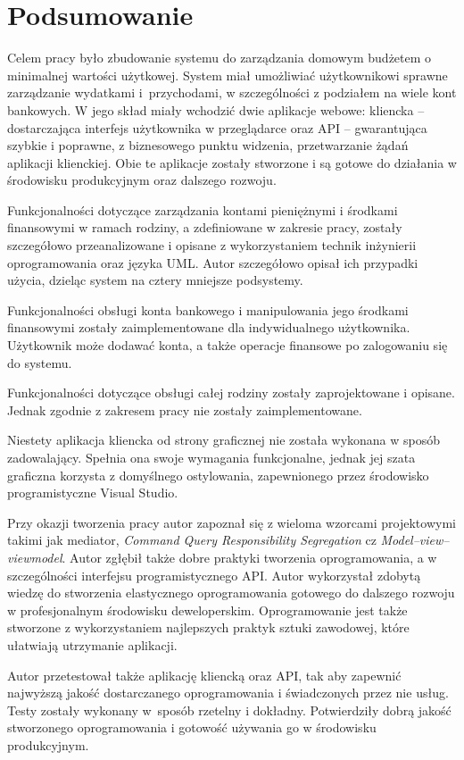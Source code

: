 \chapter{Podsumowanie}
\label{chap:podsumowanie}
Celem pracy było zbudowanie systemu do zarządzania domowym budżetem o minimalnej wartości użytkowej. System miał umożliwiać użytkownikowi sprawne zarządzanie wydatkami i~przychodami, w szczególności z podziałem na wiele kont bankowych. W jego skład miały wchodzić dwie aplikacje webowe: kliencka -- dostarczająca interfejs użytkownika w przeglądarce oraz API -- gwarantująca szybkie i poprawne, z biznesowego punktu widzenia, przetwarzanie żądań aplikacji klienckiej. Obie te aplikacje zostały stworzone i są gotowe do działania w środowisku produkcyjnym oraz dalszego rozwoju.

Funkcjonalności dotyczące zarządzania kontami pieniężnymi i środkami finansowymi w ramach rodziny, a zdefiniowane w zakresie pracy, zostały szczegółowo przeanalizowane i opisane z wykorzystaniem technik inżynierii oprogramowania oraz języka UML. Autor szczegółowo opisał ich przypadki użycia, dzieląc system na cztery mniejsze podsystemy.

Funkcjonalności obsługi konta bankowego i manipulowania jego środkami finansowymi zostały zaimplementowane dla indywidualnego użytkownika. Użytkownik może dodawać konta, a także operacje finansowe po zalogowaniu się do systemu.

Funkcjonalności dotyczące obsługi całej rodziny zostały zaprojektowane i opisane. Jednak zgodnie z zakresem pracy nie zostały zaimplementowane.

Niestety aplikacja kliencka od strony graficznej nie została wykonana w sposób zadowalający. Spełnia ona swoje wymagania funkcjonalne, jednak jej szata graficzna korzysta z domyślnego ostylowania, zapewnionego przez środowisko programistyczne Visual Studio.

Przy okazji tworzenia pracy autor zapoznał się z wieloma wzorcami projektowymi takimi jak mediator, \emph{Command Query Responsibility Segregation} cz \emph{Model–view–viewmodel}. Autor zgłębił także dobre praktyki tworzenia oprogramowania, a w szczególności interfejsu programistycznego API. Autor wykorzystał zdobytą wiedzę do stworzenia elastycznego oprogramowania gotowego do dalszego rozwoju w profesjonalnym środowisku deweloperskim. Oprogramowanie jest także stworzone z wykorzystaniem najlepszych praktyk sztuki zawodowej, które ułatwiają utrzymanie aplikacji.

Autor przetestował także aplikację kliencką oraz API, tak aby zapewnić najwyższą jakość dostarczanego oprogramowania i świadczonych przez nie usług. Testy zostały wykonany w~sposób rzetelny i dokładny. Potwierdziły dobrą jakość stworzonego oprogramowania i gotowość używania go w środowisku produkcyjnym.

